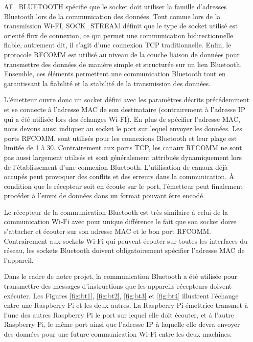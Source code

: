 \documentclass[a4paper,11pt]{article}
\begin{document}
AF\_BLUETOOTH spécifie que le socket doit utiliser la famille d’adresses Bluetooth lors de la communication des données. Tout comme lors de la transmission Wi-FI, SOCK\_STREAM définit que le type de socket utilisé est orienté flux de connexion, ce qui permet une communication bidirectionnelle fiable, autrement dit, il s'agit d'une connexion TCP traditionnelle. Enfin, le protocole RFCOMM est utilisé au niveau de la couche liaison de données pour transmettre des données de manière simple et structurée sur un lien Bluetooth. Ensemble, ces éléments permettent une communication Bluetooth tout en garantissant la fiabilité et la stabilité de la transmission des données.

\quad

L'émetteur ouvre donc un socket défini avec les paramètres décrits précédemment et se connecte à l'adresse MAC de son destinataire (contrairement à l'adresse IP qui a été utilisée lors des échanges Wi-FI). En plus de spécifier l'adresse MAC, nous devons aussi indiquer au socket le port sur lequel envoyer les données. Les ports RFCOMM, sont utilisés pour les connexions Bluetooth et leur plage est limitée de 1 à 30. Contrairement aux ports TCP, les canaux RFCOMM ne sont pas aussi largement utilisés et sont généralement attribués dynamiquement lors de l'établissement d'une connexion Bluetooth. L’utilisation de canaux déjà occupés peut provoquer des conflits et des erreurs dans la communication. À condition que le récepteur soit en écoute sur le port, l'émetteur peut finalement procéder à l'envoi de données dans un format pouvant être encodé.

\quad

Le récepteur de la communication Bluetooth est très similaire à celui de la communication Wi-Fi avec pour unique différence le fait que son socket doive s'attacher et écouter sur son adresse MAC et le bon port RFCOMM. Contrairement aux sockets Wi-Fi qui peuvent écouter sur toutes les interfaces du réseau, les sockets Bluetooth doivent obligatoirement spécifier l'adresse MAC de l'appareil.

\quad

Dans le cadre de notre projet, la communication Bluetooth a été utilisée pour transmettre des messages d'instructions que les appareils récepteurs doivent exécuter. Les Figures \ref{fig:bt1}, \ref{fig:bt2}, \ref{fig:bt3} et \ref{fig:bt4} illustrent l'échange entre une Raspberry Pi et les deux autres. La Raspberry Pi émettrice transmet à l'une des autres Raspberry Pi le port sur lequel elle doit écouter, et à l'autre Raspberry Pi, le même port ainsi que l'adresse IP à laquelle elle devra envoyer des données pour une future communication Wi-Fi entre les deux machines.
\end{document}
